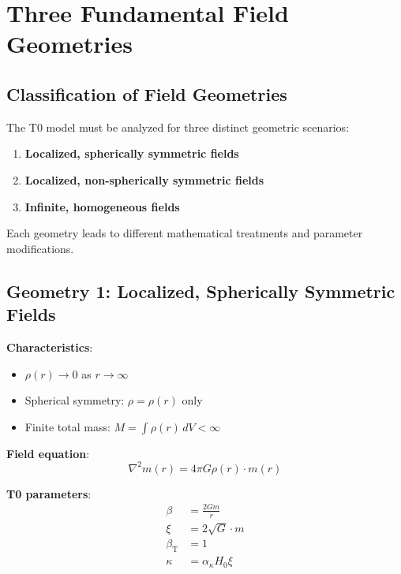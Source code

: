 \documentclass[12pt,a4paper]{article}
\newcommand{\betaT}{\beta_{\text{T}}}
\begin{document}
	\section{Three Fundamental Field Geometries}
	\label{sec:three_geometries}
	
	
	
	\subsection{Classification of Field Geometries}
	\label{subsec:geometry_classification}
	
	The T0 model must be analyzed for three distinct geometric scenarios:
	
	\begin{enumerate}
		\item \textbf{Localized, spherically symmetric fields}
		\item \textbf{Localized, non-spherically symmetric fields} 
		\item \textbf{Infinite, homogeneous fields}
	\end{enumerate}
	
	Each geometry leads to different mathematical treatments and parameter modifications.
	
	\subsection{Geometry 1: Localized, Spherically Symmetric Fields}
	\label{subsec:geometry_localized_spherical}
	
	\textbf{Characteristics}:
	\begin{itemize}
		\item $\rho(r) \to 0$ as $r \to \infty$
		\item Spherical symmetry: $\rho = \rho(r)$ only
		\item Finite total mass: $M = \int \rho(r) \, dV < \infty$
	\end{itemize}
	
	\textbf{Field equation}:
	\begin{equation}
		\nabla^2 m(r) = 4\pi G \rho(r) \cdot m(r)
	\end{equation}
	
	\textbf{T0 parameters}:
	\begin{align}
		\beta &= \frac{2Gm}{r} \\
		\xi &= 2\sqrt{G} \cdot m \\
		\betaT &= 1 \\
		\kappa &= \alpha_\kappa H_0 \xi
	\end{align}
	
\end{document}

